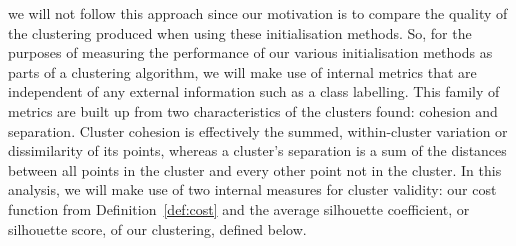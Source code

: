 we will not follow this approach since our motivation is to compare the
quality of the clustering produced when using these initialisation methods. So,
for the purposes of measuring the performance of our various initialisation
methods as parts of a clustering algorithm, we will make use of internal metrics
that are independent of any external information such as a class labelling.
This family of metrics are built up from two characteristics of the clusters
found: cohesion and separation. Cluster cohesion is effectively the summed,
within-cluster variation or dissimilarity of its points, whereas a cluster's
separation is a sum of the distances between all points in the cluster and every
other point not in the cluster. In this analysis, we will make use of two
internal measures for cluster validity: our cost function from
Definition~\ref{def:cost} and the average silhouette coefficient, or silhouette
score, of our clustering, defined below. 

%
%


